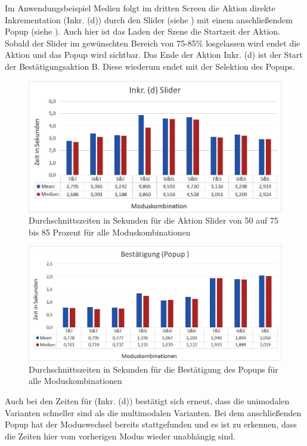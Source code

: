 Im Anwendungsbeispiel Medien folgt im dritten Screen die Aktion direkte Inkrementation (Inkr. (d)) durch den Slider (siehe ) mit einem anschließendem Popup (siehe ). 
Auch hier ist das Laden der Szene die Startzeit der Aktion. 
Sobald der Slider im gewünschten Bereich von 75-85\% losgelassen wird endet die Aktion und das Popup wird sichtbar. 
Das Ende der Aktion Inkr. (d) ist der Start der Bestätigungsaktion B. 
Diese wiederum endet mit der Selektion des Popups.
\begin{figure}[ht]
  \centering
  \includegraphics[width=1\textwidth]{img/Slider.JPG}
  \caption[Durchschnittszeiten für Inkr. (d)]{Durchschnittszeiten in Sekunden für die Aktion Slider von 50 auf 75 bis 85 Prozent für alle Moduskombinationen}
  \label{fig:Slider}
\end{figure} 
\begin{figure}[ht]
  \centering
  \includegraphics[width=1\textwidth]{img/PopupBestaetigung.JPG}
  \caption[Durchschnittszeiten für die Bestätigung des Popups]{Durchschnittszeiten in Sekunden für die Bestätigung des Popups für alle Moduskombinationen}
  \label{fig:Popup}
\end{figure} 
Auch bei den Zeiten für (Inkr. (d)) bestätigt sich erneut, dass die unimodalen Varianten schneller sind als die multimodalen Varianten. 
Bei dem anschließenden Popup hat der Moduswechsel bereits stattgefunden und es ist zu erkennen, dass die Zeiten hier vom vorherigen Modus wieder unabhängig sind.

